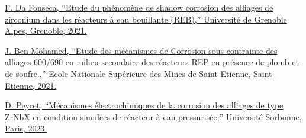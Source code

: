 \documentclass[11pt, a4paper, notitlepage]{article}
\begin{document}
    \href{http://www.theses.fr/s222058}{F. Da Fonseca, “Etude du phénomène de shadow corrosion des alliages de zirconium dans les réacteurs à eau bouillante (REB),” Université de Grenoble Alpes, Grenoble, 2021.}


    \href{http://www.theses.fr/s217506}{J. Ben Mohamed, “Etude des mécanismes de Corrosion sous contrainte des alliages 600/690 en milieu secondaire des réacteurs REP en présence de plomb et de soufre.,” Ecole Nationale Supérieure des Mines de Saint-Etienne, Saint-Etienne, 2021.}
    
    \href{http://www.theses.fr/s278984}{D. Peyret, “Mécanismes électrochimiques de la corrosion des alliages de type ZrNbX en condition simulées de réacteur à eau pressurisée,” Université Sorbonne, Paris, 2023.}
	

    \newpage
	\nocite{*}
	\printbibliography[title=Publications]
	
\end{document}
